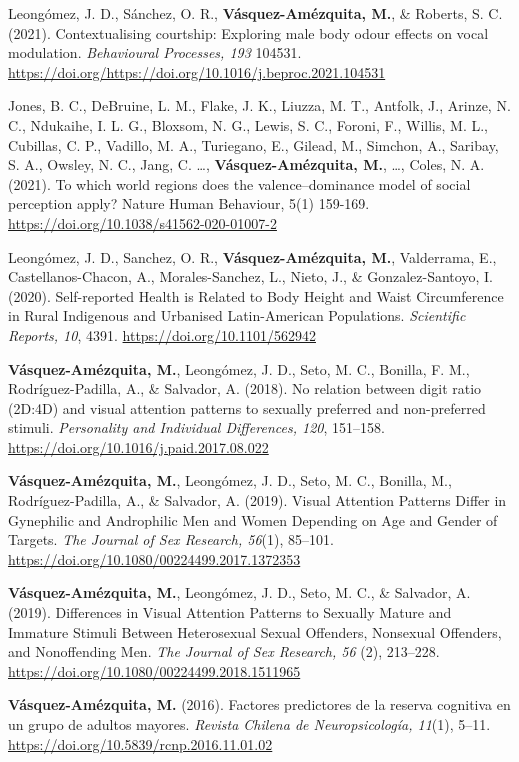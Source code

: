 \documentclass[11pt,a4paper,]{awesome-cv}
\begin{document}
Leongómez, J. D., Sánchez, O. R., \textbf{Vásquez-Amézquita, M.}, \&
Roberts, S. C. (2021). Contextualising courtship: Exploring male body
odour effects on vocal modulation. \emph{Behavioural Processes, 193}
104531.
\url{https://doi.org/https://doi.org/10.1016/j.beproc.2021.104531}

Jones, B. C., DeBruine, L. M., Flake, J. K., Liuzza, M. T., Antfolk, J.,
Arinze, N. C., Ndukaihe, I. L. G., Bloxsom, N. G., Lewis, S. C., Foroni,
F., Willis, M. L., Cubillas, C. P., Vadillo, M. A., Turiegano, E.,
Gilead, M., Simchon, A., Saribay, S. A., Owsley, N. C., Jang, C. \ldots,
\textbf{Vásquez-Amézquita, M.}, \ldots, Coles, N. A. (2021). To which
world regions does the valence--dominance model of social perception
apply? Nature Human Behaviour, 5(1) 159-169.
\url{https://doi.org/10.1038/s41562-020-01007-2}

Leongómez, J. D., Sanchez, O. R., \textbf{Vásquez-Amézquita, M.},
Valderrama, E., Castellanos-Chacon, A., Morales-Sanchez, L., Nieto, J.,
\& Gonzalez-Santoyo, I. (2020). Self-reported Health is Related to Body
Height and Waist Circumference in Rural Indigenous and Urbanised
Latin-American Populations. \emph{Scientific Reports, 10}, 4391.
\url{https://doi.org/10.1101/562942}

\textbf{Vásquez-Amézquita, M.}, Leongómez, J. D., Seto, M. C., Bonilla,
F. M., Rodríguez-Padilla, A., \& Salvador, A. (2018). No relation
between digit ratio (2D:4D) and visual attention patterns to sexually
preferred and non-preferred stimuli. \emph{Personality and Individual
Differences, 120}, 151--158.
\url{https://doi.org/10.1016/j.paid.2017.08.022}

\textbf{Vásquez-Amézquita, M.}, Leongómez, J. D., Seto, M. C., Bonilla,
M., Rodríguez-Padilla, A., \& Salvador, A. (2019). Visual Attention
Patterns Differ in Gynephilic and Androphilic Men and Women Depending on
Age and Gender of Targets. \emph{The Journal of Sex Research, 56}(1),
85--101. \url{https://doi.org/10.1080/00224499.2017.1372353}

\textbf{Vásquez-Amézquita, M.}, Leongómez, J. D., Seto, M. C., \&
Salvador, A. (2019). Differences in Visual Attention Patterns to
Sexually Mature and Immature Stimuli Between Heterosexual Sexual
Offenders, Nonsexual Offenders, and Nonoffending Men. \emph{The Journal
of Sex Research, 56} (2), 213--228.
\url{https://doi.org/10.1080/00224499.2018.1511965}

\textbf{Vásquez-Amézquita, M.} (2016). Factores predictores de la
reserva cognitiva en un grupo de adultos mayores. \emph{Revista Chilena
de Neuropsicología, 11}(1), 5--11.
\url{https://doi.org/10.5839/rcnp.2016.11.01.02}
\end{document}

